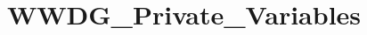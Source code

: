 \hypertarget{group___w_w_d_g___private___variables}{}\section{W\+W\+D\+G\+\_\+\+Private\+\_\+\+Variables}
\label{group___w_w_d_g___private___variables}
